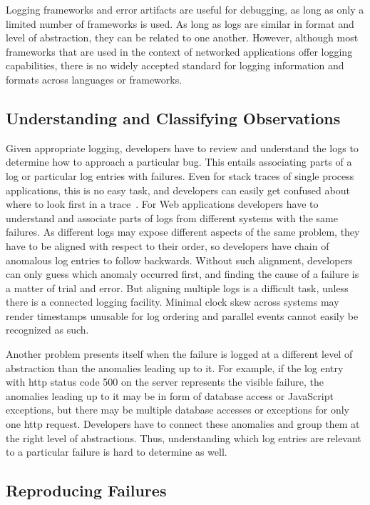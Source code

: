 Logging frameworks and error artifacts are useful for debugging, as
long as only a limited number of frameworks is used. As long as logs
are similar in format and level of abstraction, they can be related to
one another. However, although most frameworks that are used in the
context of networked applications offer logging capabilities, there is
no widely accepted standard for logging information and formats across
languages or frameworks.

\subsection{Understanding and Classifying Observations}
\label{sec:distr-reas}

Given appropriate logging, developers have to review and understand
the logs to determine how to approach a particular bug. This entails
associating parts of a log or particular log entries with
failures. Even for stack traces of single process applications, this
is no easy task, and developers can easily get confused about where to
look first in a trace~\cite{groetker2012Tdg}. For Web applications
developers have to understand and associate parts of logs from
different systems with the same failures. As different logs may expose
different aspects of the same problem, they have to be aligned with
respect to their order, so developers have chain of anomalous log
entries to follow backwards. Without such alignment, developers can
only guess which anomaly occurred first, and finding the cause of a
failure is a matter of trial and error. But aligning multiple logs is
a difficult task, unless there is a connected logging
facility. Minimal clock skew across systems may render timestamps
unusable for log ordering and parallel events cannot easily be
recognized as such.

Another problem presents itself when the failure is logged at a
different level of abstraction than the anomalies leading up to it.
For example, if the log entry with \ac{http} status code 500 on the
server represents the visible failure, the anomalies leading up to it
may be in form of database access or JavaScript exceptions, but there
may be multiple database accesses or exceptions for only one \ac{http}
request. Developers have to connect these anomalies and group them at
the right level of abstractions. Thus, understanding which log entries
are relevant to a particular failure is hard to determine as well.

\subsection{Reproducing Failures}
\label{sec:reproducing-failures}

